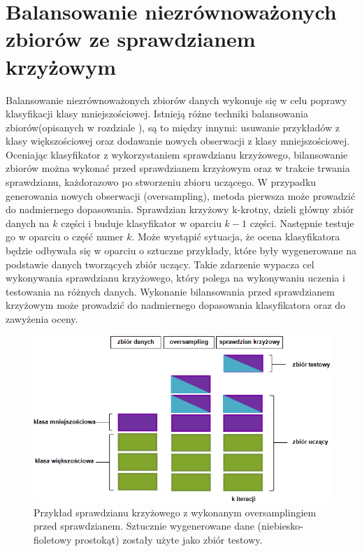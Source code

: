 \section{Balansowanie niezrównoważonych zbiorów ze sprawdzianem krzyżowym}
Balansowanie niezrównoważonych zbiorów danych wykonuje się w celu poprawy klasyfikacji klasy mniejszościowej. Istnieją różne techniki balansowania zbiorów(opisanych w rozdziale ), są to między innymi: usuwanie przykładów z klasy większościowej oraz dodawanie nowych obserwacji z klasy mniejszościowej. Oceniając klasyfikator z wykorzystaniem sprawdzianu krzyżowego, bilansowanie zbiorów można wykonać przed sprawdzianem krzyżowym oraz w trakcie trwania sprawdzianu, każdorazowo po stworzeniu zbioru uczącego. W przypadku generowania nowych obserwacji (oversampling), metoda pierwsza może prowadzić do nadmiernego dopasowania. Sprawdzian krzyżowy k-krotny, dzieli główny zbiór danych na $k$ części i buduje klasyfikator w oparciu $k-1$ części. Następnie testuje go w oparciu o część numer $k$. Może wystąpić sytuacja, że ocena klasyfikatora będzie odbywała się w oparciu o sztuczne przykłady, które były wygenerowane na podstawie danych tworzących zbiór uczący. Takie zdarzenie wypacza cel wykonywania sprawdzianu krzyżowego, który polega na wykonywaniu uczenia i testowania na różnych danych. Wykonanie bilansowania przed sprawdzianem krzyżowym może prowadzić do nadmiernego dopasowania klasyfikatora oraz do zawyżenia oceny. 
\begin{figure}[H]
	\centering
	\includegraphics[width=\textwidth]{./images/oversampling.png}
	\caption{Przykład sprawdzianu krzyżowego z wykonanym oversamplingiem przed sprawdzianem. Sztucznie wygenerowane dane (niebiesko-fioletowy prostokąt) zostały użyte jako zbiór testowy.}
	\label{fig:oversampling_wrong}
\end{figure}

